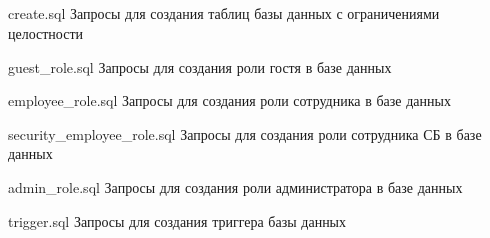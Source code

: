 \begin{appendices}
	\chapter{}
	{create.sql}
	{Запросы для создания таблиц базы данных с ограничениями целостности}
	
	{guest_role.sql}
	{Запросы для создания роли гостя в базе данных}
	
	{employee_role.sql}
	{Запросы для создания роли сотрудника в базе данных}
	
	{security_employee_role.sql}
	{Запросы для создания роли сотрудника СБ в базе данных}
	
	{admin_role.sql}
	{Запросы для создания роли администратора в базе данных}
	
	{trigger.sql}
	{Запросы для создания триггера базы данных}
\end{appendices}